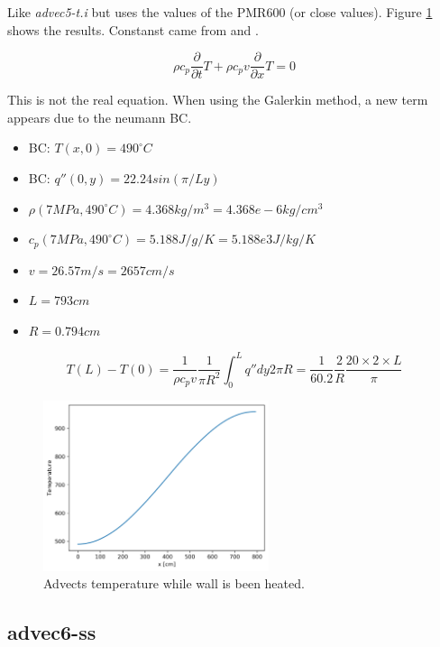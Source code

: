 \documentclass[11pt,letterpaper]{article}
\begin{document}
    Like \textit{advec5-t.i} but uses the values of the PMR600 (or close values).
    Figure \ref{fig:advec6-t} shows the results.
    Constanst came from \cite{tak_numerical_2008} and \cite{tak_development_2014}.

	\begin{equation}
    \rho c_p \frac{\partial}{\partial t}T + \rho c_p v \frac{\partial}{\partial x} T = 0
	\end{equation}

	This is not the real equation. When using the Galerkin method, a new term appears due to the neumann BC.

	\begin{itemize}
		\item BC: $T(x, 0) = 490^{\circ}C$
		\item BC: $q''(0, y) = 22.24 sin (\pi/L y)$
		\item $\rho (7 MPa, 490^{\circ}C) = 4.368 kg/m^3 = 4.368e-6 kg/cm^3$
		\item $c_p (7 MPa, 490^{\circ}C) = 5.188 J/g/K = 5.188e3 J/kg/K $
		\item $v = 26.57 m/s = 2657 cm/s$
		\item $L = 793 cm$
		\item $R = 0.794 cm$
	\end{itemize}

	\begin{equation}
	T(L) - T(0) = \frac{1}{\rho c_p v}\frac{1}{\pi R^2}\int^L_0 q'' dy 2 \pi R = \frac{1}{60.2} \frac{2}{R} \frac{20 \times 2 \times L}{\pi}
	\end{equation}

	\begin{figure}[htbp!]
		\centering
		\includegraphics[height=5cm]{advec6-t-251}
		\caption{Advects temperature while wall is been heated.}
		\label{fig:advec6-t}
	\end{figure}

	\subsection{advec6-ss}
\end{document}
